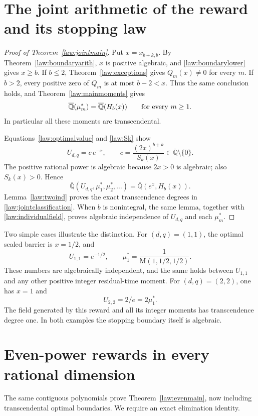 \documentclass[11pt,a4paper]{article}
\newcommand{\Qbar}{\overline{\mathbb Q}}
\newcommand{\M}{\mathrm M}
\theoremstyle{definition}
\theoremstyle{remark}
\numberwithin{equation}{section}
\begin{document}
\section{The joint arithmetic of the reward and its stopping law}

\begin{proof}[Proof of Theorem~\ref{law:jointmain}]
Put $x=x_{b+k,b}$. By Theorem~\ref{law:boundaryarith}, $x$ is positive
algebraic, and \eqref{law:boundarylower} gives $x\geq b$.
If $b\leq2$, Theorem~\ref{law:exceptions} gives $Q_m(x)\ne0$ for every
$m$. If $b>2$, every positive zero of $Q_m$ is at most $b-2<x$.
Thus the same conclusion holds, and Theorem~\ref{law:mainmoments} gives
\begin{equation}\label{law:individualfield}
 \Qbar(\mu_m^*)=\Qbar(H_b(x))
 \qquad\hbox{for every }m\geq1.
\end{equation}
In particular all these moments are transcendental.

Equations~\eqref{law:optimalvalue} and \eqref{law:Sk} show
\[
 U_{d,q}=c\,e^{-x},\qquad
 c=\frac{(2x)^{b+k}}{S_k(x)}\in\Qbar\setminus\{0\}.
\]
The positive rational power is algebraic because $2x>0$ is algebraic;
also $S_k(x)>0$. Hence
\[
 \Qbar(U_{d,q},\mu_1^*,\mu_2^*,\ldots)
 =\Qbar(e^x,H_b(x)).
\]
Lemma~\ref{law:twoind} proves the exact transcendence degrees in
\eqref{law:jointclassification}. When $b$ is nonintegral, the same lemma,
together with \eqref{law:individualfield}, proves algebraic independence
of $U_{d,q}$ and each $\mu_m^*$.
\end{proof}

Two simple cases illustrate the distinction. For $(d,q)=(1,1)$,
the optimal scaled barrier is $x=1/2$, and
\[
 U_{1,1}=e^{-1/2},\qquad
 \mu_1^*=\frac1{\M(1,1/2,1/2)}.
\]
These numbers are algebraically independent, and the same holds
between $U_{1,1}$ and any other positive integer residual-time moment.
For $(d,q)=(2,2)$, one has $x=1$ and
\[
 U_{2,2}=2/e=2\mu_1^*.
\]
The field generated by this reward and all its integer moments has
transcendence degree one. In both examples the stopping boundary
itself is algebraic.

\section{Even-power rewards in every rational dimension}

The same contiguous polynomials prove Theorem~\ref{law:evenmain}, now
including transcendental optimal boundaries. We require an exact
elimination identity.
\end{document}
